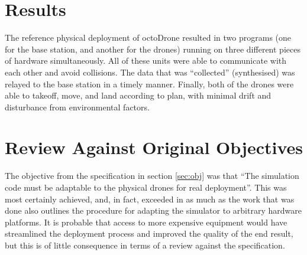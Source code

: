 \section{Results}
The reference physical deployment of octoDrone resulted in two programs (one for the base station, and another for the drones) running on three different pieces of hardware simultaneously. All of these units were able to communicate with each other and avoid collisions. The data that was ``collected'' (synthesised) was relayed to the base station in a timely manner. Finally, both of the drones were able to takeoff, move, and land according to plan, with minimal drift and disturbance from environmental factors.

\section{Review Against Original Objectives}
The objective from the specification in section \ref{sec:obj} was that ``The simulation code must be adaptable to the physical drones for real deployment''. This was most certainly achieved, and, in fact, exceeded in as much as the work that was done also outlines the procedure for adapting the simulator to arbitrary hardware platforms. It is probable that access to more expensive equipment would have streamlined the deployment process and improved the quality of the end result, but this is of little consequence in terms of a review against the specification.
